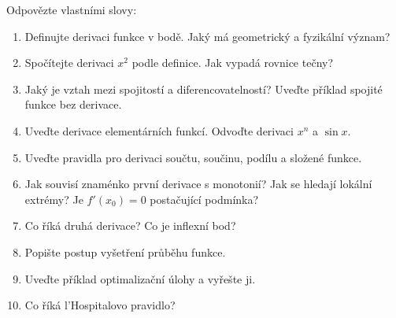 \begin{problem}
  Odpovězte vlastními slovy:
  \begin{enumerate}
    \item Definujte derivaci funkce v bodě. Jaký má geometrický a fyzikální význam?
    \item Spočítejte derivaci $x^2$ podle definice. Jak vypadá rovnice tečny?
    \item Jaký je vztah mezi spojitostí a diferencovatelností? Uveďte příklad spojité funkce bez derivace.
    \item Uveďte derivace elementárních funkcí. Odvoďte derivaci $x^n$ a $\sin x$.
    \item Uveďte pravidla pro derivaci součtu, součinu, podílu a složené funkce.
    \item Jak souvisí znaménko první derivace s monotonií? Jak se hledají lokální extrémy? Je $f'(x_0) = 0$ postačující podmínka?
    \item Co říká druhá derivace? Co je inflexní bod?
    \item Popište postup vyšetření průběhu funkce.
    \item Uveďte příklad optimalizační úlohy a vyřešte ji.
    \item Co říká l'Hospitalovo pravidlo?
  \end{enumerate}
\end{problem}
